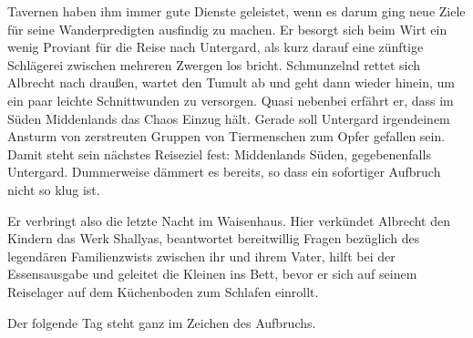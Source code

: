 Tavernen haben ihm immer gute Dienste geleistet, wenn es darum ging neue Ziele für seine Wanderpredigten ausfindig zu machen. Er besorgt sich beim Wirt ein wenig Proviant für die Reise nach Untergard, als kurz darauf eine zünftige Schlägerei zwischen mehreren Zwergen los bricht.
Schmunzelnd rettet sich Albrecht nach draußen, wartet den Tumult ab und geht dann wieder hinein, um ein paar leichte Schnittwunden zu versorgen.
Quasi nebenbei erfährt er, dass im Süden Middenlands das Chaos Einzug hält. Gerade soll Untergard irgendeinem Ansturm von zerstreuten Gruppen von Tiermenschen zum Opfer gefallen sein.
Damit steht sein nächstes Reiseziel fest: Middenlands Süden, gegebenenfalls Untergard. Dummerweise dämmert es bereits, so dass ein sofortiger Aufbruch nicht so klug ist.

Er verbringt also die letzte Nacht im Waisenhaus. Hier verkündet Albrecht den Kindern das Werk Shallyas, beantwortet bereitwillig Fragen bezüglich des legendären Familienzwists zwischen ihr und ihrem Vater, hilft bei der Essensausgabe und geleitet die Kleinen ins Bett, bevor er sich auf seinem Reiselager auf dem Küchenboden zum Schlafen einrollt.

Der folgende Tag steht ganz im Zeichen des Aufbruchs.
